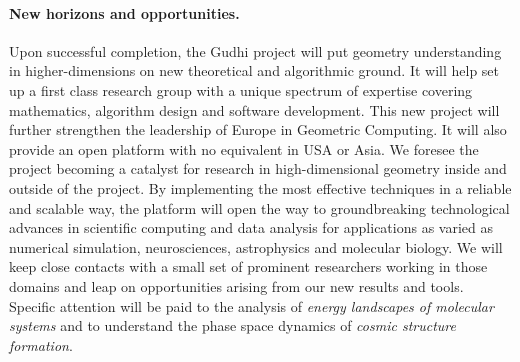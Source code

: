 



\vspace{-1mm}

\paragraph{New horizons and opportunities.} 




Upon successful completion, the Gudhi project will put geometry understanding in higher-dimensions on new theoretical and algorithmic ground. It will help set up a first class research group with a unique spectrum of expertise covering mathematics, algorithm design and software development.  This new project will further strengthen the leadership of Europe in Geometric Computing.  It will also provide an open platform with no equivalent in USA or Asia.  We foresee the project becoming a catalyst for research in high-dimensional geometry inside and outside of the project.  By implementing the most effective techniques in a reliable and scalable way, the platform will open the way to groundbreaking technological advances in scientific computing and data analysis for applications as varied as numerical simulation, neurosciences, astrophysics and molecular biology. We will keep close contacts with a small set of prominent researchers working in those domains and leap on opportunities arising from our new results and tools.  Specific attention will be paid to the analysis of {\em energy landscapes of molecular systems} and to understand the phase space dynamics of {\em cosmic structure formation}.

